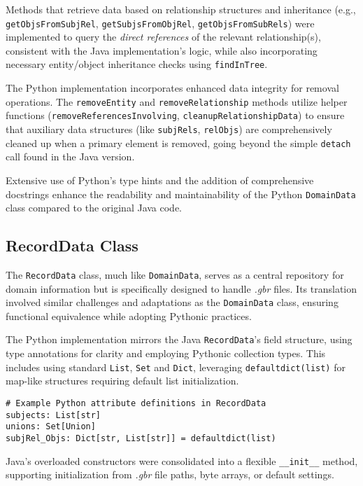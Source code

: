 \documentclass[12pt,a4paper]{article}
\begin{document}
Methods that retrieve data based on relationship structures and inheritance (e.g., \texttt{getObjsFromSubjRel}, \texttt{getSubjsFromObjRel}, \texttt{getObjsFromSubRels}) were implemented to query the \textit{direct references} of the relevant relationship(s), consistent with the Java implementation's logic, while also incorporating necessary entity/object inheritance checks using \texttt{findInTree}.

The Python implementation incorporates enhanced data integrity for removal operations. The \texttt{removeEntity} and \texttt{removeRelationship} methods utilize helper functions (\texttt{removeReferencesInvolving}, \texttt{cleanupRelationshipData}) to ensure that auxiliary data structures (like \texttt{subjRels}, \texttt{relObjs}) are comprehensively cleaned up when a primary element is removed, going beyond the simple \texttt{detach} call found in the Java version.

Extensive use of Python's type hints and the addition of comprehensive docstrings enhance the readability and maintainability of the Python \texttt{DomainData} class compared to the original Java code.

\subsection{RecordData Class}
The \texttt{RecordData} class, much like \texttt{DomainData}, serves as a central repository for domain information but is specifically designed to handle \textit{.gbr} files. Its translation involved similar challenges and adaptations as the \texttt{DomainData} class, ensuring functional equivalence while adopting Pythonic practices.

The Python implementation mirrors the Java \texttt{RecordData}'s field structure, using type annotations for clarity and employing Pythonic collection types. This includes using standard \texttt{List}, \texttt{Set} and \texttt{Dict}, leveraging \texttt{defaultdict(list)} for map-like structures requiring default list initialization.

\begin{verbatim}
# Example Python attribute definitions in RecordData
subjects: List[str]
unions: Set[Union]
subjRel_Objs: Dict[str, List[str]] = defaultdict(list)
\end{verbatim}

Java's overloaded constructors were consolidated into a flexible \texttt{\_\_init\_\_} method, supporting initialization from \textit{.gbr} file paths, byte arrays, or default settings.
\end{document}
